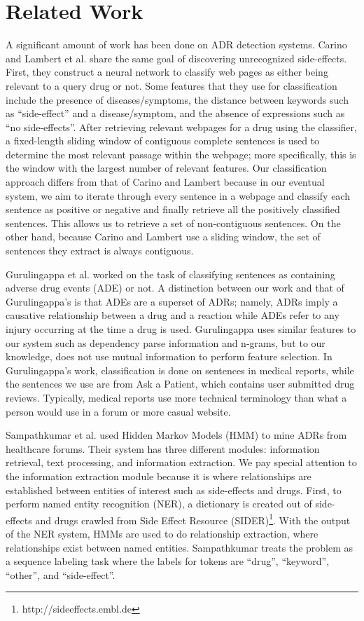 \documentclass{acm_proc_article-sp}
\begin{document}
\section{Related Work}
A significant amount of work has been done on ADR detection systems. Carino and Lambert et al. \cite{Carino} share the same goal of discovering unrecognized side-effects. First, they construct a neural network to classify web pages as either being relevant to a query drug or not. Some features that they use for classification include the presence of diseases/symptoms, the distance between keywords such as ``side-effect'' and a disease/symptom, and the absence of expressions such as ``no side-effects''. After retrieving relevant webpages for a drug using the classifier, a fixed-length sliding window of contiguous complete sentences is used to determine the most relevant passage within the webpage; more specifically, this is the window with the largest number of relevant features. Our classification approach differs from that of Carino and Lambert because in our eventual system, we aim to iterate through every sentence in a webpage and classify each sentence as positive or negative and finally retrieve all the positively classified sentences. This allows us to retrieve a set of non-contiguous sentences. On the other hand, because Carino and Lambert use a sliding window, the set of sentences they extract is always contiguous. 

Gurulingappa et al. \cite{Gurulingappa} worked on the task of classifying sentences as containing adverse drug events (ADE) or not. A distinction between our work and that of Gurulingappa's is that ADEs are a superset of ADRs; namely, ADRs imply a causative relationship between a drug and a reaction while ADEs refer to any injury occurring at the time a drug is used. Gurulingappa uses similar features to our system such as dependency parse information and n-grams, but to our knowledge, does not use mutual information to perform feature selection. In Gurulingappa's work, classification is done on sentences in medical reports, while the sentences we use are from Ask a Patient, which contains user submitted drug reviews. Typically, medical reports use more technical terminology than what a person would use in a forum or more casual website.

Sampathkumar et al. \cite{Sampathkumar} used Hidden Markov Models (HMM) to mine ADRs from healthcare forums. Their system has three different modules: information retrieval, text processing, and information extraction. We pay special attention to the information extraction module because it is where relationships are established between entities of interest such as side-effects and drugs. First, to perform named entity recognition (NER), a dictionary is created out of side-effects and drugs crawled from Side Effect Resource (SIDER)\footnote{http://sideeffects.embl.de}. With the output of the NER system, HMMs are used to do relationship extraction, where relationships exist between named entities. Sampathkumar treats the problem as a sequence labeling task where the labels for tokens are ``drug'', ``keyword'', ``other'', and ``side-effect''.
\end{document}
